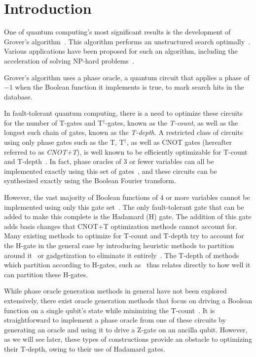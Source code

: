 \section{Introduction}
One of quantum computing's most significant results is the development of Grover's
algorithm~\cite{bib-grover1996fast}. This algorithm performs an unstructured search
optimally~\cite{bib-zaika-grov-opt}. Various applications have
been proposed for such an algorithm, including the acceleration of solving NP-hard
problems~\cite{bib-williams-grover-np}.

Grover's algorithm uses a phase oracle, a quantum circuit that applies a phase of
$-1$ when the Boolean function it implements is true, to mark search hits in the
database.

In fault-tolerant quantum computing, there is a need to optimize these circuits for
the number of T-gates and T$^{\dagger}$-gates, known as the {\it T-count}, as well
as the longest such chain of gates, known as the {\it T-depth}.
A restricted class of circuits using only phase gates such as the T, T$^\dagger$,
as well as CNOT gates (hereafter referred to as {\it CNOT+T}), is well known to be
efficiently optimizable for T-count and
T-depth~\cite{amy-meet-in-middle,bib-amy-matroid,bib-selinger-tdepth}. In fact,
phase oracles of 3 or fewer variables can all be implemented exactly using this set
of gates~\cite{bib-amy-cnot}, and these circuits can be synthesized exactly using the
Boolean Fourier transform.

However, the vast majority of Boolean functions of 4 or more variables cannot be
implemented using only this gate set~\cite{bib-amy-rm}. The only fault-tolerant gate that can be
added to make this complete is the Hadamard (H) gate. The addition of this gate adds basis changes
that CNOT+T optimization methods cannot account for. Many existing methods to optimize for T-count
and T-depth try to account for the H-gate in the general case by introducing heuristic methods to
partition around it~\cite{amy-meet-in-middle,bib-amy-matroid,bib-amy-rm} or gadgetization to eliminate it
entirely~\cite{bib-heyfron}. The T-depth of methods which partition according to H-gates, such
as~\cite{bib-amy-matroid} thus relates directly to how well it can partition these H-gates.

While phase oracle generation methods in general have not been explored extensively, there
exist oracle generation methods that focus on driving a Boolean function on a single qubit's
state while minimizing the T-count~\cite{bib-meuli-mult}. It is straightforward to implement
a phase oracle from one of these circuits by generating an oracle and using it to drive a
Z-gate on an ancilla qubit. However, as we will see later, these types of constructions provide
an obstacle to optimizing their T-depth, owing to their use of Hadamard gates.


